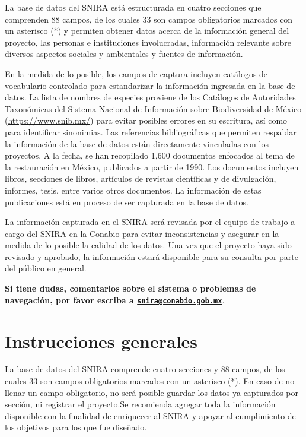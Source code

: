\documentclass[
]{book}
\begin{document}
La base de datos del SNIRA está estructurada en cuatro secciones que comprenden 88 campos, de los cuales 33 son campos obligatorios marcados con un asterisco (*) y permiten obtener datos acerca de la información general del proyecto, las personas e instituciones involucradas, información relevante sobre diversos aspectos sociales y ambientales y fuentes de información.

En la medida de lo posible, los campos de captura incluyen catálogos de vocabulario controlado para estandarizar la información ingresada en la base de datos. La lista de nombres de especies proviene de los Catálogos de Autoridades Taxonómicas del Sistema Nacional de Información sobre Biodiversidad de México (\url{https://www.snib.mx/}) para evitar posibles errores en su escritura, así como para identificar sinonimias. Las referencias bibliográficas que permiten respaldar la información de la base de datos están directamente vinculadas con los proyectos. A la fecha, se han recopilado 1,600 documentos enfocados al tema de la restauración en México, publicados a partir de 1990. Los documentos incluyen libros, secciones de libros, artículos de revistas científicas y de divulgación, informes, tesis, entre varios otros documentos. La información de estas publicaciones está en proceso de ser capturada en la base de datos.

La información capturada en el SNIRA será revisada por el equipo de trabajo a cargo del SNIRA en la Conabio para evitar inconsistencias y asegurar en la medida de lo posible la calidad de los datos. Una vez que el proyecto haya sido revisado y aprobado, la información estará disponible para su consulta por parte del público en general.

\textbf{Si tiene dudas, comentarios sobre el sistema o problemas de navegación, por favor escriba a \href{mailto:snira@conabio.gob.mx}{\nolinkurl{snira@conabio.gob.mx}}}.

\hypertarget{instrucciones-generales}{%
\chapter{Instrucciones generales}\label{instrucciones-generales}}

La base de datos del SNIRA comprende cuatro secciones y 88 campos, de los cuales 33 son campos obligatorios marcados con un asterisco (*). En caso de no llenar un campo obligatorio, no será posible guardar los datos ya capturados por sección, ni registrar el proyecto.Se recomienda agregar toda la información disponible con la finalidad de enriquecer al SNIRA y apoyar al cumplimiento de los objetivos para los que fue diseñado.
\end{document}
